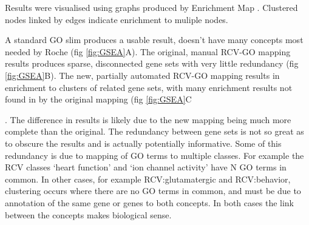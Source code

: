 \documentclass[runningheads,a4paper]{llncs}
\begin{document}
{{Results were visualised using graphs produced by Enrichment Map \cite{Merico2010}.  Clustered nodes linked by edges indicate enrichment to muliple nodes.

A standard GO slim produces a usable result, doesn't have many concepts most needed by Roche (fig \ref{fig:GSEA}A).  The original, manual RCV-GO mapping results produces sparse, disconnected gene sets with very little redundancy (fig \ref{fig:GSEA}B).  The new, partially automated RCV-GO mapping results in enrichment to clusters of related gene sets, with many enrichment results not found in by the original mapping (fig \ref{fig:GSEA}C}.  The difference in results is likely due to the new mapping being much more complete than the original.  The redundancy between gene sets is not so great as to obscure the results and is actually potentially informative.  Some of this redundancy is due to mapping of GO terms to multiple classes.  For example the RCV classes `heart function' and `ion channel activity' have N GO terms in common.  In other cases, for example RCV:glutamatergic and RCV:behavior, clustering occurs where there are no GO terms in common, and must be due to annotation of the same gene or genes to both concepts.  In both cases the link between the concepts makes biological sense.


}
\end{document}
